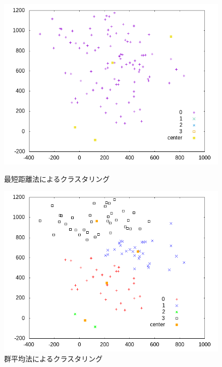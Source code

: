 \documentclass[dvipdfmx]{jsarticle}
\begin{document}
\begin{figure}[htbp]
  \begin{minipage}{0.5\hsize}
    \begin{center}
      \includegraphics[width=1.0\hsize]{./pic/mdm/m4sd200_plot.png}
    \end{center}
    \caption{最短距離法によるクラスタリング}
    \label{fig:mdm_m4sd200}
  \end{minipage}
  \begin{minipage}{0.5\hsize}
    \begin{center}
      \includegraphics[width=1.0\hsize]{./pic/gam/m4sd200_plot.png}
    \end{center}
    \caption{群平均法によるクラスタリング}
    \label{fig:gam_m4sd200}
  \end{minipage}
\end{figure}
\end{document}
